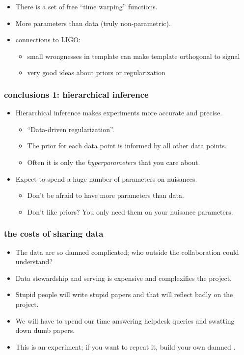 \documentclass[pdftex]{beamer}
\begin{document}
\begin{frame}
\begin{itemize}
\item There is a set of free ``time warping'' functions.
  \item More parameters than data (truly non-parametric).
  \item connections to LIGO:
    \begin{itemize}
    \item small wrongnesses in template can make template orthogonal to signal
    \item very good ideas about priors or regularization
    \end{itemize}
  \end{itemize}
\end{frame}

\begin{frame}
  \frametitle{conclusions 1: hierarchical inference}
  \begin{itemize}
  \item Hierarchical inference makes experiments more accurate and precise.
    \begin{itemize}
    \item ``Data-driven regularization''.
    \item The prior for each data point is informed by all other data points.
    \item Often it is only the \emph{hyperparameters} that you care about.
    \end{itemize}
  \item Expect to spend a huge number of parameters on nuisances.
    \begin{itemize}
    \item Don't be afraid to have more parameters than data.
    \item Don't like priors?  You only need them on your nuisance parameters.
    \end{itemize}
  \end{itemize}
\end{frame}

\begin{frame}
  \frametitle{the costs of sharing data}
  \begin{itemize}
  \item The data are so damned complicated; who outside the collaboration could understand?
  \item Data stewardship and serving is expensive and complexifies the project.
  \item Stupid people will write stupid papers and that will reflect badly on the project.
  \item We will have to spend our time answering helpdesk queries and swatting down dumb papers.
  \item This is an experiment; if you want to repeat it, build your own damned .
  \end{itemize}
\end{frame}
\end{document}
